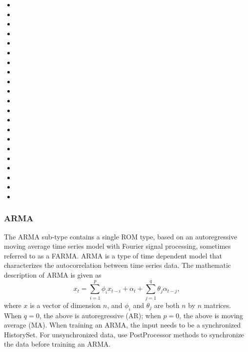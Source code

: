 \begin{itemize}
  \item {}
  \item {}
  \item {}
  \item {}
  \item {}
  \item {}
  \item {}
  \item {}
  \item {}
  \item {}
  \item {}
  \item {}
  \item {}
  \item {}
  \item {}
  \item {}
  \item {}
  \item {}
  \item {}
  \item {}
  \item {}
\end{itemize}

\subsubsection{ARMA}
\label{subsubsec:arma}
The ARMA sub-type contains a single ROM type, based on an autoregressive moving average time series model with
Fourier signal processing, sometimes referred to as a FARMA.
%
ARMA is a type of time dependent model that characterizes the autocorrelation between time series data. The mathematic description of ARMA is given as
\begin{equation*}
x_t = \sum_{i=1}^p\phi_ix_{t-i}+\alpha_t+\sum_{j=1}^q\theta_j\alpha_{t-j},
\end{equation*}
where $x$ is a vector of dimension $n$, and $\phi_i$ and $\theta_j$ are both $n$ by $n$ matrices. When $q=0$, the above is
autoregressive (AR); when $p=0$, the above is moving average (MA).
When
training an ARMA, the input needs to be a synchronized HistorySet. For unsynchronized data, use PostProcessor methods to
synchronize the data before training an ARMA.

